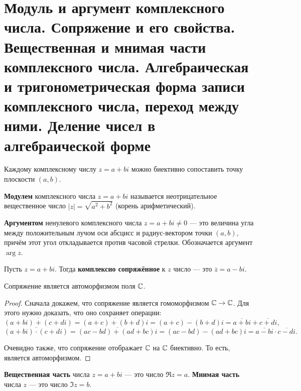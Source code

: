 \section{Модуль и аргумент комплексного числа. Сопряжение и его свойства. Вещественная и мнимая части комплексного числа. Алгебраическая и тригонометрическая форма записи комплексного числа, переход между ними. Деление чисел в алгебраической форме}

Каждому комплексному числу $z = a + bi$ можно биективно сопоставить точку плоскости $(a, b)$.

\begin{definition}
    \textbf{Модулем} комплексного числа $z = a + bi$ называется неотрицательное вещественное число $|z| = \sqrt{a^2 + b^2}$ (корень арифметический).
\end{definition}

\begin{definition}
    \textbf{Аргументом} ненулевого комплексного числа $z = a + bi \ne 0$ --- это величина угла между положительным лучом оси абсцисс и радиус-вектором точки $(a, b)$, причём этот угол откладывается против часовой стрелки. Обозначается аргумент $\arg z$.
\end{definition}

\begin{definition}
    Пусть $z = a + bi$. Тогда \textbf{комплексно сопряжённое} к $z$ число --- это $\overline{z} = a - bi$.
\end{definition}

\begin{theorem}
    Сопряжение является автоморфизмом поля $\mathbb{C}$.
\end{theorem}

\begin{proof}
    Сначала докажем, что сопряжение является гомоморфизмом $\mathbb{C} \rightarrow \mathbb{C}$. Для этого нужно доказать, что оно сохраняет операции:
    $$
        \overline{(a + bi) + (c + di)} = \overline{(a + c) + (b + d)i} = (a + c) - (b + d)i = \overline{a + bi} + \overline{c + di},
    $$
    $$
        \overline{(a + bi)\cdot (c + di)} = \overline{(ac - bd) + (ad + bc)i} = (ac - bd) - (ad + bc)i = \overline{a - bi} \cdot \overline{c - di}.
    $$

    Очевидно также, что сопряжение отображает $\mathbb{C}$ на $\mathbb{C}$ биективно. То есть, является автоморфизмом.
\end{proof}

\begin{definition}
    \textbf{Вещественная часть} числа $z = a + bi$ --- это число $\Re z = a$. \textbf{Мнимая часть} числа $z$ --- это число $\Im z = b$.
\end{definition}

